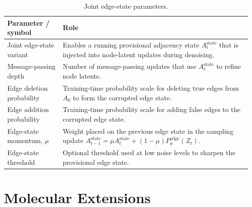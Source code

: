 \begin{table}[p]
\centering
\footnotesize
\begin{tabularx}{\textwidth}{@{}p{}X@{}}
\toprule
Parameter / symbol & Role \\
\midrule
Joint edge-state variant & Enables a running provisional adjacency state \(A_t^{\mathrm{state}}\) that is injected into node-latent updates during denoising. \\
Message-passing depth & Number of message-passing updates that use \(A_t^{\mathrm{state}}\) to refine node latents. \\
Edge deletion probability & Training-time probability scale for deleting true edges from \(A_0\) to form the corrupted edge state. \\
Edge addition probability & Training-time probability scale for adding false edges to the corrupted edge state. \\
Edge-state momentum, \(\mu\) & Weight placed on the previous edge state in the sampling update \(A_{t-1}^{\mathrm{state}}=\mu A_t^{\mathrm{state}}+(1-\mu)P_\theta^{\mathrm{edge}}(Z_t)\). \\
Edge-state threshold & Optional threshold used at low noise levels to sharpen the provisional edge state. \\
\bottomrule
\end{tabularx}
\caption{Joint edge-state parameters.}
\label{tab:generator-joint-edge-parameters}
\end{table}

\section{Molecular Extensions}


